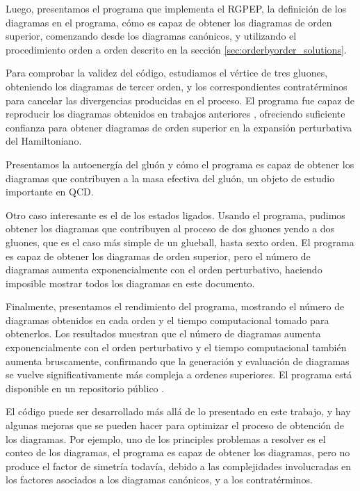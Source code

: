 \documentclass[11pt,a4paper,twoside,pdf]{article}
\numberwithin{equation}{section}
\begin{document}
Luego, presentamos el programa que implementa el RGPEP, la definici\'on de los diagramas
en el programa, c\'omo es capaz de obtener los diagramas de orden superior, comenzando
desde los diagramas can\'onicos, y utilizando el procedimiento orden a orden descrito en la secci\'on
\ref{sec:orderbyorder_solutions}.

Para comprobar la validez del c\'odigo, estudiamos el v\'ertice de tres gluones,
obteniendo los diagramas de tercer orden, y los correspondientes contrat\'erminos para cancelar
las divergencias producidas en el proceso. El programa fue capaz de reproducir los
diagramas obtenidos en trabajos anteriores \cite{QCDG}, ofreciendo suficiente confianza para obtener diagramas de
orden superior en la expansi\'on perturbativa del Hamiltoniano.

Presentamos la autoenerg\'ia del glu\'on y c\'omo el programa es capaz de
obtener los diagramas que contribuyen a la masa efectiva
del glu\'on, un objeto de estudio importante en QCD.

Otro caso interesante es el de los estados ligados.
Usando el programa, pudimos obtener los diagramas que contribuyen al proceso
de dos gluones yendo a dos gluones, que es el caso m\'as simple de un glueball, hasta sexto orden.
El programa es capaz de obtener los diagramas de orden superior, pero el n\'umero de
diagramas aumenta exponencialmente con el orden perturbativo, haciendo imposible
mostrar todos los diagramas en este documento.

Finalmente, presentamos el rendimiento del programa, mostrando el n\'umero de diagramas
obtenidos en cada orden y el tiempo computacional tomado para obtenerlos. Los resultados
muestran que el n\'umero de diagramas aumenta exponencialmente con el orden perturbativo
y el tiempo computacional tambi\'en aumenta bruscamente, confirmando que la generaci\'on
y evaluaci\'on de diagramas se vuelve significativamente m\'as compleja a ordenes superiores.
El programa est\'a disponible en un repositorio p\'ublico \cite{Liu_Computational_tools_for_2025}.

El código puede ser desarrollado m\'as all\'a de lo presentado en este trabajo, y hay algunas mejoras que se pueden
hacer para optimizar el proceso de obtenci\'on de los diagramas. Por ejemplo, uno de los principles problemas a
resolver es el conteo de los diagramas, el programa es capaz de obtener los diagramas,
pero no produce el factor de simetr\'ia todav\'ia, debido a las complejidades involucradas en los factores
asociados a los diagramas can\'onicos, y a los contrat\'erminos.
\end{document}
